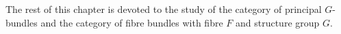 The rest of this chapter is devoted to the study of the category of principal $G$-bundles and the category of fibre bundles with fibre $F$ and structure group $G$.
